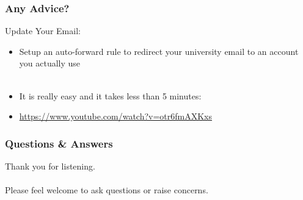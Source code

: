 \begin{frame}
	\frametitle{Any Advice?}	
	
	Update Your Email:
	
	\begin{itemize}
		\item Setup an auto-forward rule to redirect your university email to an account you actually use
		\\~\\
		\item It is really easy and it takes less than 5 minutes:
		\item \url{https://www.youtube.com/watch?v=otr6fmAXKxs}
	\end{itemize}
\end{frame}

\begin{frame}
	\frametitle{Questions \& Answers}	
	\begin{center}
		Thank you for listening. 
		\\~\\
		Please feel welcome to ask questions or raise concerns.
	\end{center}
\end{frame}


